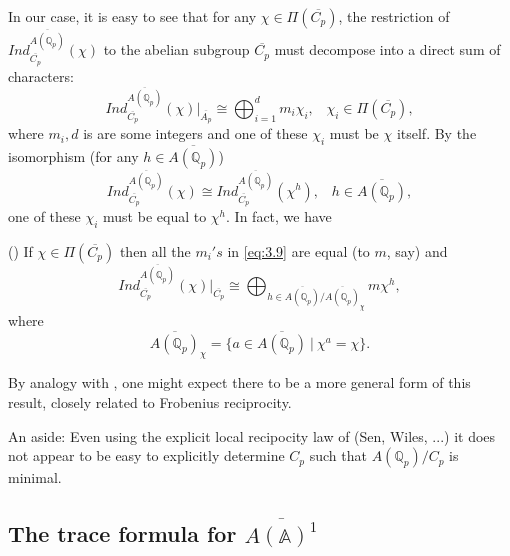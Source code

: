 In our case, it is easy to see that for any
$\chi \in \Pi (\overline{C_p})$,
the restriction of
$Ind_{\overline{C_p}}^{\overline{A({\mathbb{Q}}_p)}}(\chi )$
to the abelian subgroup
$\overline{C_p}$ must decompose into a direct sum of
characters: 
\begin{equation}\label{eq:3.9}
Ind_{\overline{C_p}}^{\overline{A({\mathbb{Q}}_p)}}(\chi )|_{\overline{A_p}}
\cong \bigoplus_{i=1}^dm_i\chi _i,
\;\;\;\chi _i\in \Pi (\overline{C_p}),
\end{equation}
where $m_i,d$ is are some integers and
one of these $\chi _i$ must be $\chi $ itself. By the isomorphism
(for any $h\in \overline{A({\mathbb{Q}}_p)}$)
\begin{equation}\label{eq:3.10}
Ind_{\overline{C_p}}^{\overline{A({\mathbb{Q}}_p)}}(\chi )
\cong Ind_{\overline{C_p}}^{\overline{A({\mathbb{Q}}_p)}}(\chi ^h),
\;\;\;h\in \overline{A({\mathbb{Q}}_p)},
\end{equation}
one of these $\chi _i$ must be equal to $\chi ^h$.
In fact, we have

\begin{lemma}\label{lem:3.5} (\cite[Lemma 2.1]{GeKn})
If $\chi \in \Pi (\overline{C_p})$ then all the $m_i's$ in \eqref{eq:3.9} are
equal (to $m$, say) and
\[
Ind_{\overline{C_p}}^{\overline{A({\mathbb{Q}}_p)}}(\chi )|_{\overline{C_p}}
\cong \bigoplus_{h\in \overline{A({\mathbb{Q}}_p)}
/\overline{A({\mathbb{Q}}_p)}_{\chi}}
m\chi ^h,
\]
where
\[
\overline{A({\mathbb{Q}}_p)}_{\chi}
=\{a\in\overline{A({\mathbb{Q}}_p)} \ |\ \chi^a=\chi\}.
\]
\end{lemma}

\begin{remark}\label{rem:3.6} By analogy with \cite[ch 7]{Se}, one might expect there to
be a more general form of this result, closely related to
Frobenius reciprocity.
\end{remark}
\begin{remark}\label{rem:3.7}
An aside: Even using the explicit local recipocity law of
(Sen, Wiles, ...) it does not appear to be
easy to explicitly determine $C_p$
such that $A({\mathbb{Q}}_p)/C_p$ is minimal.
\end{remark}


\subsection{The trace formula for \emph{$\overline{A({\mathbb{A}})^1}$}}

